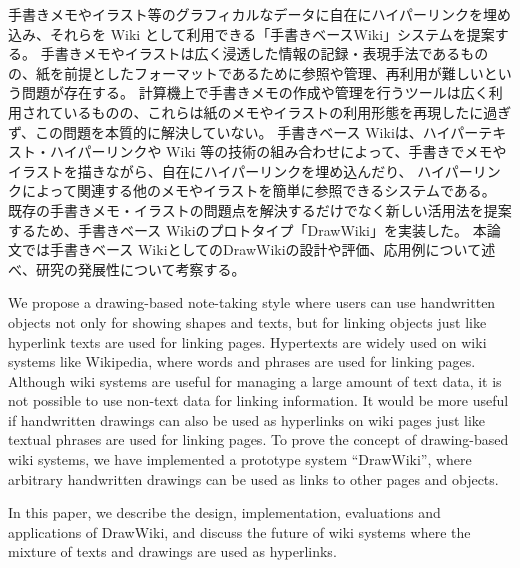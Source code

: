 \begin{jabstract}

 手書きメモやイラスト等のグラフィカルなデータに自在にハイパーリンクを埋め込み、それらを Wiki として利用できる「手書きベースWiki」システムを提案する。
 手書きメモやイラストは広く浸透した情報の記録・表現手法であるものの、紙を前提としたフォーマットであるために参照や管理、再利用が難しいという問題が存在する。
 計算機上で手書きメモの作成や管理を行うツールは広く利用されているものの、これらは紙のメモやイラストの利用形態を再現したに過ぎず、この問題を本質的に解決していない。
 手書きベース Wikiは、ハイパーテキスト・ハイパーリンクや Wiki 等の技術の組み合わせによって、手書きでメモやイラストを描きながら、自在にハイパーリンクを埋め込んだり、
 ハイパーリンクによって関連する他のメモやイラストを簡単に参照できるシステムである。
 既存の手書きメモ・イラストの問題点を解決するだけでなく新しい活用法を提案するため、手書きベース Wikiのプロトタイプ「DrawWiki」を実装した。
 本論文では手書きベース WikiとしてのDrawWikiの設計や評価、応用例について述べ、研究の発展性について考察する。

\end{jabstract}


\begin{eabstract}

 We propose a drawing-based note-taking style where users can use handwritten objects not only for showing shapes and texts,
 but for linking objects just like hyperlink texts are used for linking pages.
 Hypertexts are widely used on wiki systems like Wikipedia, where words and phrases are used for linking pages.
 Although wiki systems are useful for managing a large amount of text data, it is not possible to use non-text data for linking information.
 It would be more useful if handwritten drawings can also be used as hyperlinks on wiki pages just like textual phrases are used for linking pages.
 To prove the concept of drawing-based wiki systems, we have implemented a prototype system “DrawWiki”, where arbitrary handwritten drawings can be used as links to other pages and objects.

 In this paper, we describe the design, implementation, evaluations and applications of DrawWiki, and discuss the future of wiki systems where the mixture of texts and drawings are used as hyperlinks.


\end{eabstract}
